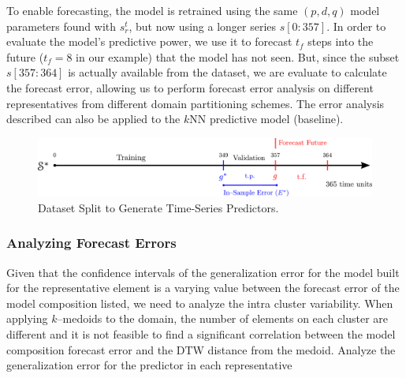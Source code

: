 To enable forecasting, the model is retrained using the same $(p, d, q)$ model parameters found with $s^t_r$, but now using a longer series $s[0:357]$. In order to evaluate the model's predictive power, we use it to forecast $t_f$ steps into the future ($t_f = 8$ in our example) that the model has not seen. But, since the subset $s[357:364]$ is actually available from the dataset, we are evaluate to calculate the forecast error, allowing us to perform forecast error analysis on different representatives from different domain partitioning schemes. The error analysis described can also be applied to the $k$NN predictive model (baseline).
 
\begin{figure}[h]
	\centering
	\includegraphics[scale=0.35]{../Figures/ModelRegion_ModelTS}
	\caption{Dataset Split to Generate Time-Series Predictors.}
	\label{Fig:Time-SeriesModel}
\end{figure}

\subsubsection{Analyzing Forecast Errors}
\label{Sec:AnalyzeForecastErrors}

Given that the confidence intervals of the generalization error for the model built for the representative element is a varying value between the forecast error of the model composition listed, we need to analyze the intra cluster variability. When applying $k$--medoids to the domain, the number of elements on each cluster are different and it is not feasible to find a significant correlation between the model composition forecast error and the DTW distance from the medoid.
Analyze the generalization error for the predictor in each representative 


